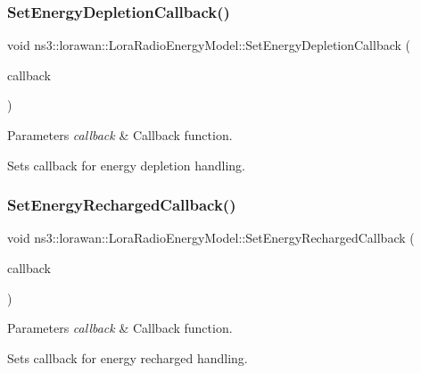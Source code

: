\subsubsection{\texorpdfstring{Set\+Energy\+Depletion\+Callback()}{SetEnergyDepletionCallback()}}
{\footnotesize\ttfamily void ns3\+::lorawan\+::\+Lora\+Radio\+Energy\+Model\+::\+Set\+Energy\+Depletion\+Callback (\begin{DoxyParamCaption}\item[{\hyperlink{classns3_1_1lorawan_1_1LoraRadioEnergyModel_a14be2fabbb8f8bab0e0c3c909f1f5662}{Lora\+Radio\+Energy\+Depletion\+Callback}}]{callback }\end{DoxyParamCaption})}


\begin{DoxyParams}{Parameters}
{\em callback} & Callback function.\\
\hline
\end{DoxyParams}
Sets callback for energy depletion handling. \mbox{\label{classns3_1_1lorawan_1_1LoraRadioEnergyModel_a8cae43df0c796eaa137dc823651f7426}} 
\subsubsection{\texorpdfstring{Set\+Energy\+Recharged\+Callback()}{SetEnergyRechargedCallback()}}
{\footnotesize\ttfamily void ns3\+::lorawan\+::\+Lora\+Radio\+Energy\+Model\+::\+Set\+Energy\+Recharged\+Callback (\begin{DoxyParamCaption}\item[{\hyperlink{classns3_1_1lorawan_1_1LoraRadioEnergyModel_aa621913a2b37844d79e4033f85d650dc}{Lora\+Radio\+Energy\+Recharged\+Callback}}]{callback }\end{DoxyParamCaption})}


\begin{DoxyParams}{Parameters}
{\em callback} & Callback function.\\
\hline
\end{DoxyParams}
Sets callback for energy recharged handling. \mbox{\label{classns3_1_1lorawan_1_1LoraRadioEnergyModel_a871b6cd0b3c0505c2be884599e85929b}} 
